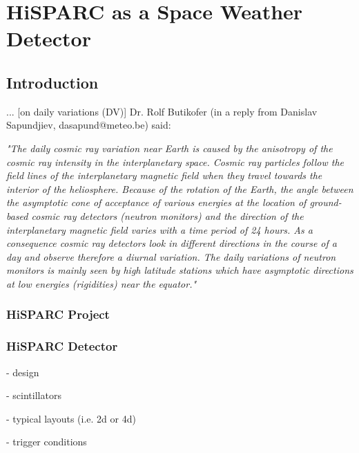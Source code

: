 \chapter{HiSPARC as a Space Weather Detector}\label{chap:HiSPARC}

\section{Introduction}\label{sec:HS_intro}

... [on daily variations (DV)] Dr. Rolf Butikofer (in a reply from Danislav Sapundjiev, dasapund@meteo.be) said:

\textit{"The daily cosmic ray variation near Earth is caused by the anisotropy of the cosmic ray intensity in the interplanetary space. Cosmic ray particles follow the field lines of the interplanetary magnetic field when they travel towards the interior of the heliosphere. Because of the rotation of the Earth, the angle between the asymptotic cone of acceptance of various energies at the location of ground-based cosmic ray detectors (neutron monitors) and the direction of the interplanetary magnetic field varies with a time period of 24 hours. As a consequence cosmic ray detectors look in different directions in the course of a day and observe therefore a diurnal variation. The daily variations of neutron monitors is mainly seen by high latitude stations which have asymptotic directions at low energies (rigidities) near the equator."}


\subsection{HiSPARC Project}

\subsection{HiSPARC Detector}
 - design
 
 - scintillators
 
 - typical layouts (i.e. 2d or 4d)
 
 - trigger conditions


